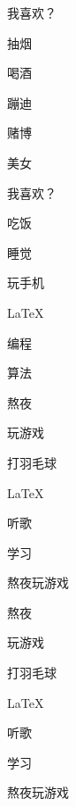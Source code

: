 \documentclass{ctexart}
\begin{document}
\begin{minipage}[t]{0.4\textwidth}
我喜欢？
\begin{test}[colorlist ={ blue,red,yellow,cyan,black},vsep = 10pt]
	\item 抽烟
	\item* 喝酒
	\item  蹦迪
	\item  赌博
	\item* 美女
\end{test}	
\end{minipage}
\begin{minipage}[t]{0.4\textwidth}
我喜欢？
\begin{test}[color = blue]
	\item 吃饭
	\item 睡觉
	\item* 玩手机
	\item* \LaTeX 
	\item* 编程
	\item* 算法
\end{test}	
\end{minipage}
\begin{test}[colorlist={green,cyan,red,blue,red,yellow,red}]
	\item*熬夜 
	\item 玩游戏
	\item* 打羽毛球 
	\item* LaTeX
	\item* 听歌
	\item 学习
	\item* 熬夜玩游戏
  \end{test} 
\begin{test}[parsep = 1cm,colorlist={pink,brown,orange,magenta,purple,tan,gray}]
	\item*熬夜 
	\item 玩游戏
	\item* 打羽毛球 
	\item* LaTeX
	\item* 听歌
	\item 学习
	\item* 熬夜玩游戏
\end{test}
\end{document}
